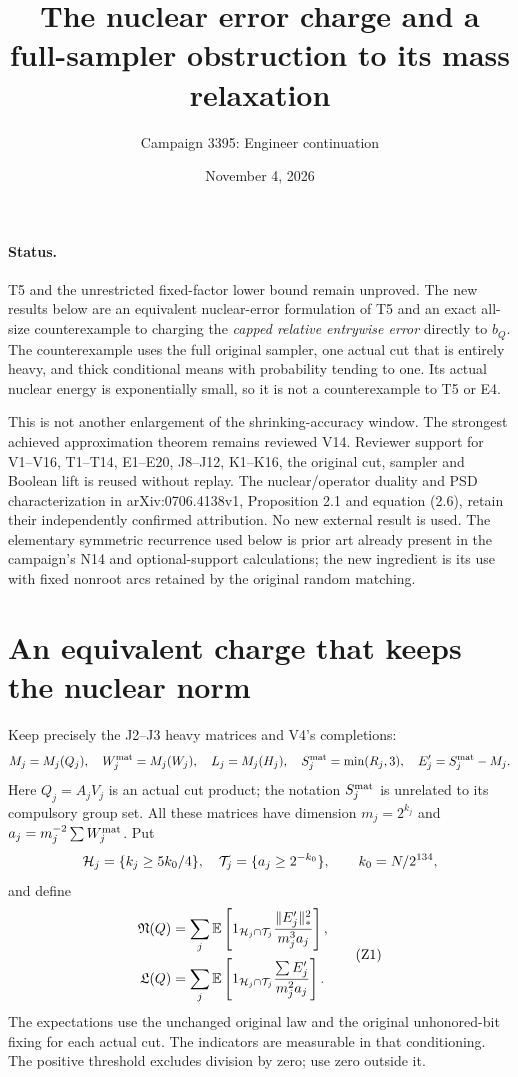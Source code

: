 \documentclass[11pt]{article}
\title{The nuclear error charge and a full-sampler obstruction to its mass relaxation}
\author{Campaign 3395: Engineer continuation}
\date{November 4, 2026}
\newcommand{\E}{\mathbb E}
\begin{document}
\maketitle

\paragraph{Status.}
T5 and the unrestricted fixed-factor lower bound remain unproved.
The new results below are an equivalent nuclear-error formulation of
T5 and an exact all-size counterexample to charging the
\emph{capped relative entrywise error} directly to $b_Q$.
The counterexample uses the full original sampler, one actual cut
that is entirely heavy, and thick conditional means with probability
tending to one. Its actual nuclear energy is exponentially small,
so it is not a counterexample to T5 or E4.

This is not another enlargement of the shrinking-accuracy window.
The strongest achieved approximation theorem remains reviewed V14.
Reviewer support for V1--V16, T1--T14, E1--E20, J8--J12, K1--K16,
the original cut, sampler and Boolean lift is reused without replay.
The nuclear/operator duality and PSD characterization in
arXiv:0706.4138v1, Proposition 2.1 and equation (2.6), retain their
independently confirmed attribution. No new external result is used.
The elementary symmetric recurrence used below is prior art already
present in the campaign's N14 and optional-support calculations;
the new ingredient is its use with fixed nonroot arcs retained by
the original random matching.

\section{An equivalent charge that keeps the nuclear norm}
Keep precisely the J2--J3 heavy matrices and V4's completions:
\[
 M_j=M_j(Q_j),\quad W_j^{\rm mat}=M_j(W_j),\quad
 L_j=M_j(H_j),\quad S_j^{\rm mat}=\min(R_j,3),\quad
 E'_j=S_j^{\rm mat}-M_j .
\]
Here $Q_j=A_jV_j$ is an actual cut product; the notation
$S_j^{\rm mat}$ is unrelated to its compulsory group set.
All these matrices have dimension $m_j=2^{k_j}$ and
$a_j=m_j^{-2}\sum W_j^{\rm mat}$.
Put
\[
 {\cal H}_j=\{k_j\ge5k_0/4\},\quad
 {\cal T}_j=\{a_j\ge2^{-k_0}\},\qquad k_0=N/2^{134},
\]
and define
\[
 \begin{split}
 {\mathfrak N}(Q)
 &=\sum_j\E\left[
     1_{{\cal H}_j\cap{\cal T}_j}
          \frac{\|E'_j\|_*^2}{m_j^3a_j}\right],\\
 {\mathfrak L}(Q)
 &=\sum_j\E\left[
     1_{{\cal H}_j\cap{\cal T}_j}
          \frac{\sum E'_j}{m_j^2a_j}\right].
 \end{split}                                                   \tag{Z1}
\]
The expectations use the unchanged original law and the original
unhonored-bit fixing for each actual cut. The indicators are
measurable in that conditioning. The positive threshold excludes
division by zero; use zero outside it.
\end{document}
